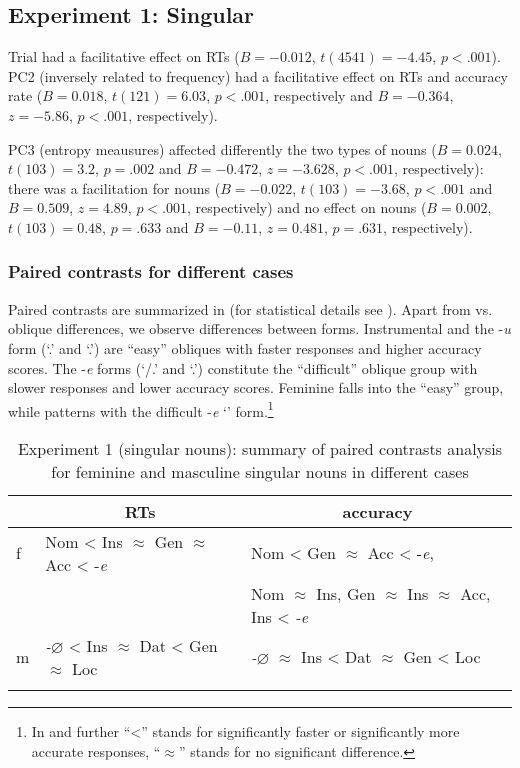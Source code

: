 \documentclass[output=paper, modfonts,newtxmath,hidelinks]{langscibook}
\begin{document}
\subsection{Experiment 1: Singular}

Trial had a facilitative effect on RTs ($B=-0.012$, $t(4541)=-4.45$, $p<.001$). PC2 (inversely related to frequency) had a facilitative effect on RTs and accuracy rate ($B= 0.018$, $t(121)= 6.03$, $p< .001$, respectively and $B= -0.364$, $z= -5.86$, $p< .001$, respectively). 

PC3 (entropy meausures) affected differently the two types of nouns ($B= 0.024$, $t(103)= 3.2$, $p= .002$ and $B= -0.472$, $z= -3.628$, $p< .001$, respectively):  there was a facilitation for  nouns ($B= -0.022$, $t(103)= -3.68$, $p< .001$ and $B= 0.509$, $z= 4.89$, $p< .001$, respectively) and no effect on  nouns ($B= 0.002$, $t(103)= 0.48$, $p= .633$ and $B= -0.11$, $z= 0.481$, $p= .631$, respectively).

\subsubsection{Paired contrasts for different cases} 
Paired contrasts  
are summarized in  (for statistical details see ). Apart from  vs. oblique differences, we observe differences between  forms. Instrumental and the -\textit{u} form (`\accc.\fem' and `\datt.\masc') are ``easy'' obliques with faster responses and higher accuracy scores. The -\textit{e} forms (`\datt/\locc.\fem' and `\locc.\masc') constitute the ``difficult'' oblique group with slower responses and lower accuracy scores. Feminine  falls into the ``easy'' group, while   patterns with the difficult -\textit{e} `\locc' form.\footnote{In  and further ``<'' stands for significantly faster or significantly more accurate responses, ``$\approx$'' stands for no significant difference.}

\begin{table}
	\caption{Experiment 1 (singular nouns): summary of paired contrasts analysis for feminine and masculine singular nouns in different cases}
    \label{tab:caseSgHierarchy}
    \begin{tabular}{*{3}l}
    \lsptoprule
    ~	&	\multicolumn{1}{c}{RTs}	&	\multicolumn{1}{c}{accuracy}\\
    \midrule
    f	&	Nom < Ins $\approx$ Gen $\approx$ Acc < -\textit{e}	&	Nom < Gen $\approx$ Acc < -\textit{e}, \\
    ~	&	~	&	Nom $\approx$ Ins, Gen $\approx$ Ins $\approx$ Acc, Ins < \textit{-e}\\
    m	&	\textit{-$\varnothing$} < Ins $\approx$ Dat < Gen $\approx$ Loc	&	\textit{-$\varnothing$} $\approx$ Ins < Dat $\approx$ Gen  < Loc			\\
    \lspbottomrule
    \end{tabular}
\end{table}
\end{document}
